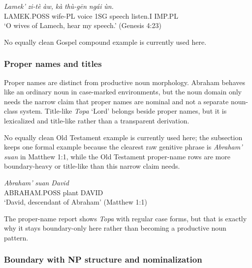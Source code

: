 \documentclass[
  11pt,
  a4paper,
]{article}
\newcommand{\tdim}[1]{\textit{#1}}
\newcommand{\tdimword}[1]{\textit{#1}}
\renewcommand{\textsc}[1]{{\footnotesize\MakeUppercase{#1}}}
\newcommand{\glossquote}[1]{`#1'}
\begin{document}
\begin{exe}
\ex \label{ex:noun-thugen}
\gll \tdimword{Lamek'} \tdimword{zi-tè} \tdimword{àw,} \tdimword{kà} \tdimword{thù-gēn} \tdimword{ngái} \tdimword{ùn.} \\
     \textsc{lamek}.\textsc{poss} wife-\textsc{pl} voice \textsc{1sg} speech listen.\textsc{i} \textsc{imp}.\textsc{pl} \\
\glt \glossquote{O wives of Lamech, hear my speech.} (Genesis 4:23)
\end{exe}

No equally clean Gospel compound example is currently used here.

\subsubsection{Proper names and titles}\label{proper-names-and-titles}

Proper names are distinct from productive noun morphology. Abraham
behaves like an ordinary noun in case-marked environments, but the noun
domain only needs the narrow claim that proper names are nominal and not
a separate noun-class system. Title-like \tdim{Topa} \glossquote{Lord}
belongs beside proper names, but it is lexicalized and title-like rather
than a transparent derivation.

No equally clean Old Testament example is currently used here; the
subsection keeps one formal example because the clearest raw genitive
phrase is \tdim{Abraham' suan} in Matthew 1:1, while the Old Testament
proper-name rows are more boundary-heavy or title-like than this narrow
claim needs.

\begin{exe}
\ex \label{ex:noun-abraham-suan-david}
\gll \tdimword{Abraham'} \tdimword{suan} \tdimword{David} \\
     \textsc{abraham}.\textsc{poss} plant \textsc{david} \\
\glt \glossquote{David, descendant of Abraham} (Matthew 1:1)
\end{exe}

The proper-name report shows \tdim{Topa} with regular case forms, but
that is exactly why it stays boundary-only here rather than becoming a
productive noun pattern.

\subsubsection{Boundary with NP structure and
nominalization}\label{boundary-with-np-structure-and-nominalization}
\end{document}
